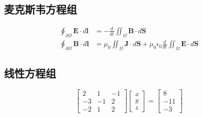 \documentclass{article}
\begin{document}
\subsection{麦克斯韦方程组}
\begin{align}
\oint_{\partial \Omega} \mathbf{E} \cdot d\mathbf{l} &= -\frac{d}{dt} \iint_{\Omega} \mathbf{B} \cdot d\mathbf{S} \\
\oint_{\partial \Omega} \mathbf{B} \cdot d\mathbf{l} &= \mu_0 \iint_{\Omega} \mathbf{J} \cdot d\mathbf{S} + \mu_0\epsilon_0 \frac{d}{dt} \iint_{\Omega} \mathbf{E} \cdot d\mathbf{S}
\end{align}

\subsection{线性方程组}
\[
\begin{bmatrix}
2 & 1 & -1 \\
-3 & -1 & 2 \\
-2 & 1 & 2 
\end{bmatrix}
\begin{bmatrix}
x \\
y \\
z 
\end{bmatrix}
=
\begin{bmatrix}
8 \\
-11 \\
-3 
\end{bmatrix}
\]
\end{document}
